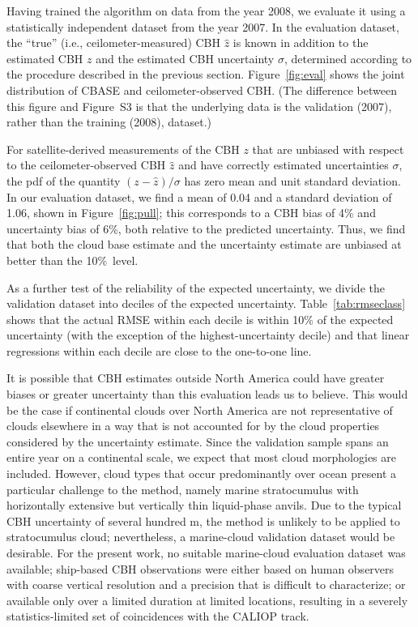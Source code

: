 \documentclass[essd,manuscript]{copernicus}\usepackage[]{graphicx}\usepackage[]{color}
\newcommand{\hlnum}[1]{\textcolor[rgb]{0.686,0.059,0.569}{#1}}%
\newcommand\comment[2]{\{\hlnum{ \textit{#1}: #2}\}}
\newcommand\commentjm[1]{\comment{$j_\mu$}{#1}}
\begin{document}
Having trained the algorithm on data from the year 2008, we evaluate it using a
statistically independent dataset from the year 2007.  In the evaluation
dataset, the ``true'' (i.e., ceilometer-measured) CBH $\hat{z}$ is known in
addition to the estimated CBH $z$ and the estimated CBH uncertainty $\sigma$,
determined according to the procedure described in the previous section.
Figure~\ref{fig:eval} shows the joint distribution of CBASE and
ceilometer-observed CBH.  (The difference between this figure and Figure~S3 is
that the underlying data is the validation (2007), rather than the training (2008), dataset.)

For satellite-derived measurements of the CBH $z$ that are unbiased with respect
to the ceilometer-observed CBH $\hat{z}$ and have correctly estimated
uncertainties $\sigma$, the pdf of the quantity $(z - \hat{z})/\sigma$ has zero
mean and unit standard deviation. In our evaluation dataset, we find a mean of
0.04 and a standard
deviation of 1.06, shown in
Figure~\ref{fig:pull}; this corresponds to a CBH bias of %
4\% and
uncertainty bias of %
6\%,
both relative to the predicted uncertainty.  Thus, we find that both the cloud
base estimate and the uncertainty estimate are unbiased at better than the 10\%\
level.

As a further test of the reliability of the expected uncertainty, we divide the
validation dataset into deciles of the expected uncertainty.
Table~\ref{tab:rmseclass} shows that the actual RMSE within each decile is
within 10\% of the expected uncertainty (with the exception of the highest-uncertainty
decile) and that linear regressions within each
decile are close to the one-to-one line.

It is possible that CBH estimates outside North America could have greater
biases or greater uncertainty than this evaluation leads us to believe.  This
would be the case if continental clouds over North America are not
representative of clouds elsewhere in a way that is not accounted for by the
cloud properties considered by the uncertainty estimate.  Since the validation
sample spans an entire year on a continental scale, we expect that most cloud
morphologies are included.
However, cloud types that occur predominantly over ocean
present a particular challenge to the method, namely marine stratocumulus with
horizontally extensive but vertically thin liquid-phase anvils.  Due to the
typical CBH uncertainty of several hundred m, the method is unlikely to be
applied to stratocumulus cloud; nevertheless, a marine-cloud validation dataset
would be desirable.  For the present work, no suitable marine-cloud evaluation
dataset was available; ship-based CBH observations were either based on human
observers with coarse vertical resolution and a precision that is difficult to
characterize; or available only over a limited duration at limited
locations, resulting in a severely statistics-limited set of coincidences with
the CALIOP track.
\end{document}

